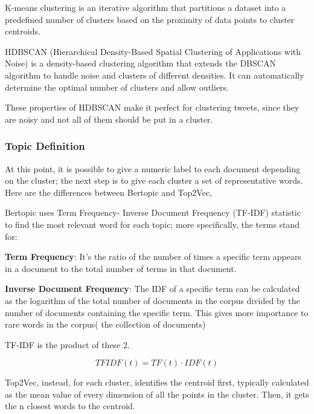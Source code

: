 K-means clustering \cite{jin_k-means_2010} is an iterative algorithm that partitions a dataset into a predefined number of clusters based on the proximity of data points to cluster centroids.

HDBSCAN  \cite{mcinnes_hdbscan_2017}(Hierarchical Density-Based Spatial Clustering of Applications with Noise) is a density-based clustering algorithm that extends the DBSCAN algorithm to handle noise and clusters of different densities. It can automatically determine the optimal number of clusters and allow outliers.

These properties of HDBSCAN make it perfect for clustering tweets, since they are noisy and not all  of them should be put in a cluster.

\subsubsection{Topic Definition}
At this point, it is possible to give a numeric label to each document depending on the cluster; the next step is to give each cluster a set of representative words.
 Here are the differences between Bertopic and Top2Vec,

Bertopic uses Term Frequency- Inverse Document Frequency (TF-IDF) \cite{rajaraman_data_2011}  statistic to find the most relevant word for each topic; more specifically, the terms stand for:

\textbf{Term Frequency}: It's the ratio of the number of times a specific term appears in a document to the total number of terms in that document.

\textbf{Inverse Document Frequency}: The IDF of a specific term can be calculated as the logarithm of the total number of documents in the corpus divided by the number of documents containing the specific term. This gives more importance to rare words in the corpus( the collection of documents) 

TF-IDF is the product of these 2.

\begin{equation}
    TFIDF(t) = TF(t) \cdot IDF(t)
\end{equation}



Top2Vec, instead,  for each cluster,  identifies the centroid first, typically calculated as the mean value of every dimension of all the points in the cluster. Then, it gets the n closest words to the centroid.



